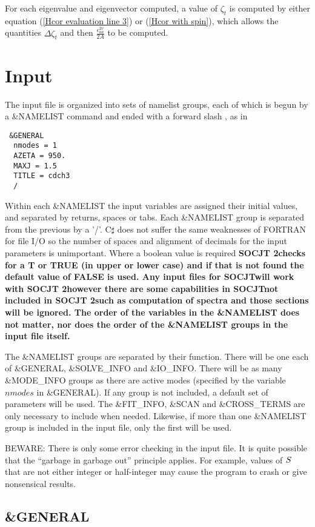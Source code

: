 \documentclass{article}
\newcommand{\socjttwo}{\bf{SOCJT 2}}
\newcommand{\socjt}{{\bf SOCJT}}
\begin{document}
For each eigenvalue and eigenvector computed, a value of $\zeta _t$ is
computed by either equation (\ref{Hcor evaluation line 3}) or 
(\ref{Hcor with spin}), which allows the quantities $\Delta \zeta _t $
and then $\frac{\epsilon _{aa}^{2v}}{2A}$ to be computed.

\section{Input} \label{section:input}

The input file is organized into sets of namelist groups, each of
which is begun by a \&NAMELIST command and ended with a forward slash
\/, as in 
\begin{verbatim}
 &GENERAL 
  nmodes = 1
  AZETA = 950.
  MAXJ = 1.5
  TITLE = cdch3 
  /
\end{verbatim}
Within each \&NAMELIST the input variables are assigned their initial
values, and separated by returns, spaces or tabs. Each \&NAMELIST group is separated from
the previous by a '/'. C$\sharp$ does not suffer the same weaknesses of FORTRAN for file I/O
so the number of spaces and alignment of decimals for the input parameters is unimportant.
Where a boolean value is required \socjttwo checks for a T or TRUE (in upper or lower case)
and if that is not found the default value of FALSE is used. Any input files for \socjt will work
with \socjttwo however there are some capabilities in \socjt not included in \socjttwo such as 
computation of spectra and those sections will be ignored. The order of the variables in
the \&NAMELIST does not matter, nor does the order of the \&NAMELIST
groups in the input file itself.

The \&NAMELIST groups are separated by their function. There will be one each of
\&GENERAL, \&SOLVE\_INFO and \&IO\_INFO. There will be as many \&MODE\_INFO groups as there are active modes
(specified by the variable $nmodes$ in \&GENERAL). If any group is not included,
a default set of parameters will be used. The \&FIT\_INFO, \&SCAN and \&CROSS\_TERMS 
are only necessary to include when needed. Likewise, if more than one
\&NAMELIST group is included in the input file, only the first will be
used. 

BEWARE: There is only some error checking in the input file. It is
quite possible that the ``garbage in garbage out'' principle
applies. For example, values of ${\bf S}$ that are not either integer
or half-integer may cause the program to crash or give nonsensical
results.

\subsection{\&GENERAL}
\end{document}
